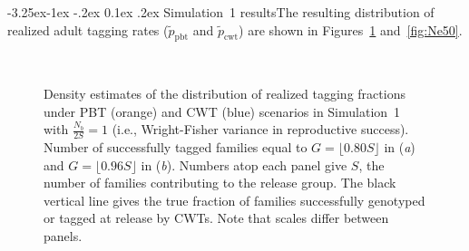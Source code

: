 \documentclass[11pt]{article}
\makeatletter
\renewcommand\subsection{\@startsection{subsection}{2}{\z@}%
                                     {-3.25ex\@plus -1ex \@minus -.2ex}%
                                     {0.1ex \@plus .2ex}%
                                     {\normalfont\normalsize\bfseries}}
\makeatother
\begin{document}
\subsection{Simulation~1 results}The resulting distribution of realized adult tagging
rates ($\tilde{p}_\mathrm{pbt}$ and $\tilde{p}_\mathrm{cwt}$)
are shown in Figures~\ref{fig:wf80} and~\ref{fig:Ne50}.
\begin{figure}
\centering
\mbox{
	~~~~~
}
\caption{Density estimates of the distribution of realized tagging fractions under PBT (orange) and CWT (blue) scenarios
in Simulation~1 with $\frac{N_b}{2S} = 1$ (i.e., Wright-Fisher variance in reproductive success). Number of successfully tagged families
equal to $G = \lfloor0.80S\rfloor$ in ({\em a}) and $G = \lfloor0.96S\rfloor$ in ({\em b}).  Numbers
atop each panel give $S$, the number of families contributing to the release group. The black vertical line
gives the true fraction of families successfully genotyped or tagged at release by CWTs. Note that
scales differ between panels.}
\label{fig:wf80}
\end{figure}
\end{document}
